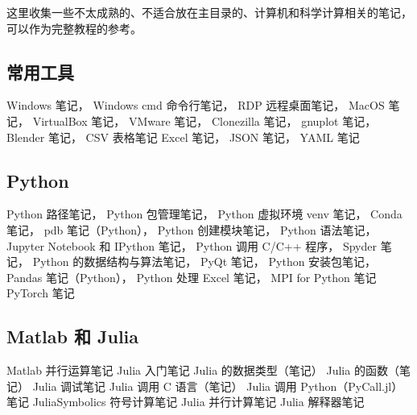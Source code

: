 
这里收集一些不太成熟的、不适合放在主目录的、计算机和科学计算相关的笔记，可以作为完整教程的参考。

\subsection{常用工具}
Windows 笔记，
Windows cmd 命令行笔记，
RDP 远程桌面笔记，
MacOS 笔记，
VirtualBox 笔记，
VMware 笔记，
Clonezilla 笔记，
gnuplot 笔记，
Blender 笔记，
CSV 表格笔记
Excel 笔记，
JSON 笔记，
YAML 笔记

\subsection{Python}
Python 路径笔记，
Python 包管理笔记，
Python 虚拟环境 venv 笔记，
Conda 笔记，
pdb 笔记（Python），
Python 创建模块笔记，
Python 语法笔记，
Jupyter Notebook 和 IPython 笔记，
Python 调用 C/C++ 程序，
Spyder 笔记，
Python 的数据结构与算法笔记，
PyQt 笔记，
Python 安装包笔记，
Pandas 笔记（Python），
Python 处理 Excel 笔记，
MPI for Python 笔记
PyTorch 笔记

\subsection{Matlab 和 Julia}
Matlab 并行运算笔记
Julia 入门笔记
Julia 的数据类型（笔记）
Julia 的函数（笔记）
Julia 调试笔记
Julia 调用 C 语言（笔记）
Julia 调用 Python（PyCall.jl）笔记
JuliaSymbolics 符号计算笔记
Julia 并行计算笔记
Julia 解释器笔记

